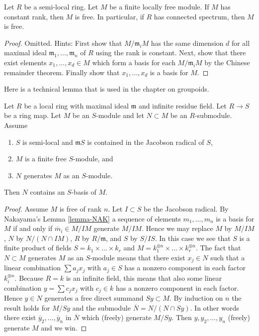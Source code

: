 \begin{lemma}
\label{lemma-locally-free-semi-local-free}
Let $R$ be a semi-local ring.
Let $M$ be a finite locally free module.
If $M$ has constant rank, then $M$ is free. In particular, if $R$ has
connected spectrum, then $M$ is free.
\end{lemma}

\begin{proof}
Omitted. Hints: First show that $M/\mathfrak m_iM$ has the
same dimension $d$ for all maximal ideal $\mathfrak m_1, \ldots, \mathfrak m_n$
of $R$ using the rank is constant.
Next, show that there exist elements $x_1, \ldots, x_d \in M$
which form a basis for each $M/\mathfrak m_iM$ by the Chinese
remainder theorem. Finally show that $x_1, \ldots, x_d$ is a basis for $M$.
\end{proof}

\noindent
Here is a technical lemma that is used in the chapter on groupoids.

\begin{lemma}
\label{lemma-semi-local-module-basis-in-submodule}
Let $R$ be a local ring with maximal ideal $\mathfrak m$ and
infinite residue field.
Let $R \to S$ be a ring map.
Let $M$ be an $S$-module and let $N \subset M$ be an $R$-submodule.
Assume
\begin{enumerate}
\item $S$ is semi-local and $\mathfrak mS$ is contained in the
Jacobson radical of $S$,
\item $M$ is a finite free $S$-module, and
\item $N$ generates $M$ as an $S$-module.
\end{enumerate}
Then $N$ contains an $S$-basis of $M$.
\end{lemma}

\begin{proof}
Assume $M$ is free of rank $n$. Let $I \subset S$ be the Jacobson radical.
By Nakayama's Lemma \ref{lemma-NAK} a sequence of elements
$m_1, \ldots, m_n$ is a basis for $M$ if and only if
$\overline{m}_i \in M/IM$ generate $M/IM$. Hence we may replace
$M$ by $M/IM$, $N$ by $N/(N \cap IM)$, $R$ by $R/\mathfrak m$,
and $S$ by $S/IS$. In this case we see that $S$ is a finite product
of fields $S = k_1 \times \ldots \times k_r$ and
$M = k_1^{\oplus n} \times \ldots \times k_r^{\oplus n}$.
The fact that $N \subset M$ generates $M$ as an $S$-module
means that there exist $x_j \in N$ such that a linear combination
$\sum a_j x_j$ with $a_j \in S$ has a nonzero component in each
factor $k_i^{\oplus n}$.
Because $R = k$ is an infinite field, this means that also
some linear combination $y = \sum c_j x_j$ with $c_j \in k$ has a
nonzero component in each factor. Hence $y \in N$ generates a
free direct summand $Sy \subset M$. By induction on $n$ the result
holds for $M/Sy$ and the submodule $\overline{N} = N/(N \cap Sy)$.
In other words there exist $\overline{y}_2, \ldots, \overline{y}_n$
in $\overline{N}$ which (freely) generate $M/Sy$. Then
$y, y_2, \ldots, y_n$ (freely) generate $M$ and we win.
\end{proof}

